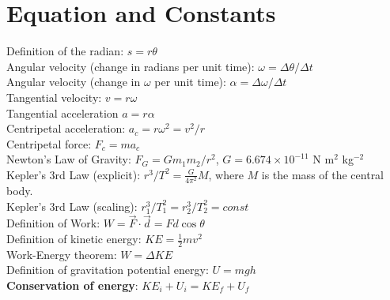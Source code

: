 \documentclass[10pt]{article}
\begin{document}
\maketitle
\small
\section{Equation and Constants}
Definition of the radian: $s = r \theta$ \\
Angular velocity (change in radians per unit time): $\omega = \Delta \theta/\Delta t$ \\
Angular velocity (change in $\omega$ per unit time): $\alpha = \Delta \omega/\Delta t$ \\
Tangential velocity: $v = r\omega$ \\
Tangential acceleration $a = r\alpha$ \\
Centripetal acceleration: $a_c = r\omega^2 = v^2/r$ \\
Centripetal force: $F_c = m a_c$ \\
Newton's Law of Gravity: $F_G = G m_1 m_2 / r^2$, $G = 6.674\times 10^{-11}$ N m$^2$ kg$^{-2}$ \\
Kepler's 3rd Law (explicit): $r^3/T^2 = \frac{G}{4\pi^2} M$, where $M$ is the mass of the central body. \\
Kepler's 3rd Law (scaling): $r_1^3/T_1^2 = r_2^3/T_2^2 = const$ \\
Definition of Work: $W = \vec{F} \cdot \vec{d} = Fd\cos\theta$ \\
Definition of kinetic energy: $KE = \frac{1}{2} mv^2$ \\
Work-Energy theorem: $W = \Delta KE$ \\
Definition of gravitation potential energy: $U = mgh$ \\
\textbf{Conservation of energy}: $KE_i + U_i = KE_f + U_f$
\end{document}

